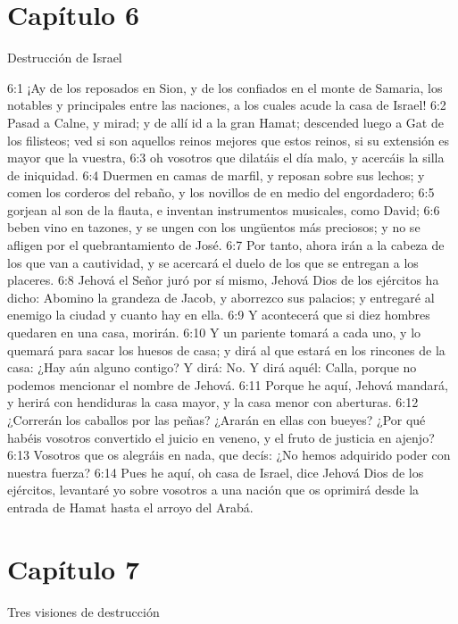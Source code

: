\section*{Capítulo 6  }
Destrucción de Israel   
  
6:1 ¡Ay de los reposados en Sion, y de los confiados en el monte de Samaria, los notables y principales entre las naciones, a los cuales acude la casa de Israel!   
6:2 Pasad a Calne, y mirad; y de allí id a la gran Hamat; descended luego a Gat de los filisteos; ved si son aquellos reinos mejores que estos reinos, si su extensión es mayor que la vuestra,   
6:3 oh vosotros que dilatáis el día malo, y acercáis la silla de iniquidad.   
6:4 Duermen en camas de marfil, y reposan sobre sus lechos; y comen los corderos del rebaño, y los novillos de en medio del engordadero;   
6:5 gorjean al son de la flauta, e inventan instrumentos musicales, como David;   
6:6 beben vino en tazones, y se ungen con los ungüentos más preciosos; y no se afligen por el quebrantamiento de José.   
6:7 Por tanto, ahora irán a la cabeza de los que van a cautividad, y se acercará el duelo de los que se entregan a los placeres.   
6:8 Jehová el Señor juró por sí mismo, Jehová Dios de los ejércitos ha dicho: Abomino la grandeza de Jacob, y aborrezco sus palacios; y entregaré al enemigo la ciudad y cuanto hay en ella.   
6:9 Y acontecerá que si diez hombres quedaren en una casa, morirán.   
6:10 Y un pariente tomará a cada uno, y lo quemará para sacar los huesos de casa; y dirá al que estará en los rincones de la casa: ¿Hay aún alguno contigo? Y dirá: No. Y dirá aquél: Calla, porque no podemos mencionar el nombre de Jehová.   
6:11 Porque he aquí, Jehová mandará, y herirá con hendiduras la casa mayor, y la casa menor con aberturas.   
6:12 ¿Correrán los caballos por las peñas? ¿Ararán en ellas con bueyes? ¿Por qué habéis vosotros convertido el juicio en veneno, y el fruto de justicia en ajenjo?   
6:13 Vosotros que os alegráis en nada, que decís: ¿No hemos adquirido poder con nuestra fuerza?   
6:14 Pues he aquí, oh casa de Israel, dice Jehová Dios de los ejércitos, levantaré yo sobre vosotros a una nación que os oprimirá desde la entrada de Hamat hasta el arroyo del Arabá.   
\section*{Capítulo 7 } 
Tres visiones de destrucción   
  
